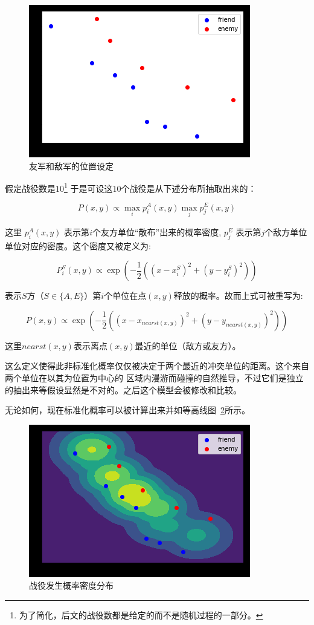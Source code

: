 \documentclass{article}
\begin{document}
\begin{figure}[ht]
\includegraphics{state_no_battle.png}
\caption{
友军和敌军的位置设定}
\label{fig:stateNoBattle}
\end{figure}



假定战役数是$10$\footnote{为了简化，后文的战役数都是给定的而不是随机过程的一部分。}
于是可设这$10$个战役是从下述分布所抽取出来的：

$$
P(x,y) \propto \max_i p^A_{i}(x,y) \max_j p^E_{j} (x,y)
$$


这里 $p^A_{i}(x,y)$ 表示第$i$个友方单位“散布”出来的概率密度,
$p^E_{j}$ 表示第$j$个敌方单位单位对应的密度。这个密度又被定义为:


$$
P^S_i(x,y) \propto \exp(-\frac{1}{2}((x-x^S_i)^2 + (y-y^S_i)^2))
$$


表示$S$方（$S \in \{A,E  \}$）第$i$个单位在点$(x,y)$释放的概率。故而上式可被重写为: 

$$
P(x,y) \propto \exp(-\frac{1}{2}((x-x_{nearst(x,y)})^2 + (y-y_{nearst(x,y)})^2))
$$


这里$nearst(x,y)$表示离点$(x,y)$最近的单位（敌方或友方）。

这么定义使得此非标准化概率仅仅被决定于两个最近的冲突单位的距离。这个来自两个单位在以其为位置为中心的
区域内漫游而碰撞的自然推导，不过它们是独立的抽出来等假设显然是不对的。之后这个模型会被修改和比较。

无论如何，现在标准化概率可以被计算出来并如等高线图~\ref{fig:stateNoBattleProb}所示。

\begin{figure}[ht]
\includegraphics{state_no_battle_prob.png}
\caption{战役发生概率密度分布}
\label{fig:stateNoBattleProb}
\end{figure}
\end{document}
